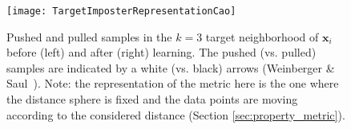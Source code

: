 \begin{figure}[h!]
	\centering
	\begin{minipage}[b]{0.75\linewidth}		
		\centerline{\texttt{[image: TargetImposterRepresentationCao]}}
	\end{minipage}
	\caption[Pushed and pulled samples in the $k=3$ target neighborhood of $\textbf{x}_i$ before (left) and after (right) learning.]{Pushed and pulled samples in the $k=3$ target neighborhood of $\textbf{x}_i$ before (left) and after (right) learning. The pushed (vs. pulled) samples are indicated by a white (vs. black) arrows (Weinberger \& Saul~\cite{Weinberger2009}). Note: the representation of the metric here is the one where the distance sphere is fixed and the data points are moving according to the considered distance (Section \ref{sec:property_metric}). }
	\label{fig:TargetImposterRepresentation}
\end{figure}

